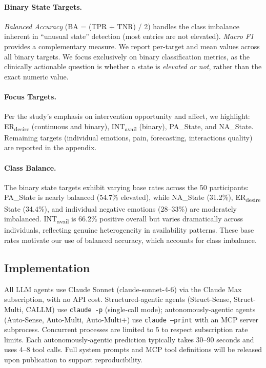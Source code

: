 \documentclass[screen,review,anonymous]{acmart}
\newcommand{\erdesire}{ER\textsubscript{desire}}
\newcommand{\intavail}{INT\textsubscript{avail}}
\begin{document}
\paragraph{Binary State Targets.}
\emph{Balanced Accuracy} (BA = (TPR + TNR) / 2) handles the class imbalance inherent in ``unusual state'' detection (most entries are not elevated). \emph{Macro F1} provides a complementary measure. We report per-target and mean values across all binary targets. We focus exclusively on binary classification metrics, as the clinically actionable question is whether a state is \emph{elevated or not}, rather than the exact numeric value.

\paragraph{Focus Targets.}
Per the study's emphasis on intervention opportunity and affect, we highlight: \erdesire{} (continuous and binary), \intavail{} (binary), PA\_State, and NA\_State. Remaining targets (individual emotions, pain, forecasting, interactions quality) are reported in the appendix.

\paragraph{Class Balance.}
The binary state targets exhibit varying base rates across the 50 participants: PA\_State is nearly balanced (54.7\% elevated), while NA\_State (31.2\%), \erdesire{} State (34.4\%), and individual negative emotions (28--33\%) are moderately imbalanced. \intavail{} is 66.2\% positive overall but varies dramatically across individuals, reflecting genuine heterogeneity in availability patterns. These base rates motivate our use of balanced accuracy, which accounts for class imbalance.

\subsection{Implementation}

All LLM agents use Claude Sonnet (claude-sonnet-4-6) via the Claude Max subscription, with no API cost. Structured-agentic agents (Struct-Sense, Struct-Multi, CALLM) use \texttt{claude -p} (single-call mode); autonomously-agentic agents (Auto-Sense, Auto-Multi, Auto-Multi+) use \texttt{claude --print} with an MCP server subprocess. Concurrent processes are limited to 5 to respect subscription rate limits. Each autonomously-agentic prediction typically takes 30--90 seconds and uses 4--8 tool calls. Full system prompts and MCP tool definitions will be released upon publication to support reproducibility.
\end{document}
